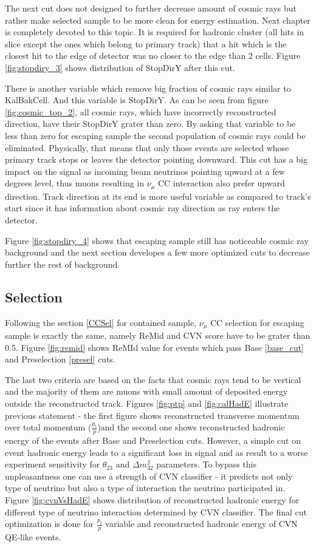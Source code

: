 The next cut does not designed to further decrease amount of cosmic rays but rather make selected sample 
to be more clean for energy estimation. Next chapter is completely devoted to this topic. It is required for 
hadronic cluster (all hits in slice except the ones which belong to primary track) that a hit which is the 
closest hit to the edge of detector was no closer to the edge than 2 cells. Figure \ref{fig:stopdiry_3} shows
distribution of StopDirY after this cut. 

There is another variable which remove big fraction of cosmic rays similar to KalBakCell. And this variable 
is StopDirY. As can be seen from figure \ref{fig:cosmic_top_2}, all cosmic rays, which have incorrectly reconstructed
direction, have their StopDirY grater than zero. By asking that variable to be less than zero for escaping 
sample the second population of cosmic rays could be eliminated. Physically, that means that only those events
are selected whose primary track stops or leaves the detector pointing downward. This cut has a big impact
on the signal as incoming beam neutrinos pointing upward at a few degrees level, thus muons resulting in $\nu_\mu$
CC interaction also prefer upward direction. Track direction at its end is more useful variable as compared to
track's start since it has information about cosmic ray direction as ray enters the detector. 

Figure \ref{fig:stopdiry_4} shows that escaping sample still has noticeable cosmic ray background and the next 
section developes a few more optimized cuts to decrease further the rest of background.

\subsection{Selection}
Following the section \ref{CCSel} for contained sample, $\nu_\mu$ CC selection for escaping sample is exactly 
the same, namely ReMid and CVN score have to be grater than 0.5. Figure \ref{fig:remid} shows ReMId value for
events which pass Base \ref{base_cut} and Preselection \ref{presel} cuts. 

The last two criteria are based on the facts that cosmic rays tend to be vertical and the majority of them are 
muons with small amount of deposited energy outside the reconstructed track. Figures \ref{fig:ptp} and \ref{fig:calHadE}
illustrate previous statement - the first figure shows reconstructed transverse momentum over total momentum 
($\frac{p_t}{p}$)and the second one shows reconstructed hadronic energy of the events after Base and Preselection 
cuts. However, a simple cut on event hadronic energy leads to a significant loss in signal and as result to a 
worse experiment sensitivity for $\theta_23$ and $\Delta m^2_{32}$ parameters. To bypass this unpleasantness one 
can use a strength of CVN classifier - it predicts not only type of neutrino but also a type of interaction the 
neutrino participated in. Figure \ref{fig:cvnVsHadE} shows distribution of reconstructed hadronic energy for 
different type of neutrino interaction determined by CVN classifier. The final cut optimization is done for 
$\frac{p_t}{p}$ variable and reconstructed hadronic energy of CVN QE-like events.

